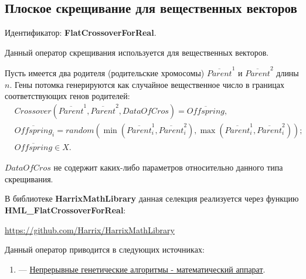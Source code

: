 \subsection{Плоское скрещивание для вещественных векторов}\label{SetOfOperatorsAlgorithms:FlatCrossoverForReal}

Идентификатор: \textbf{FlatCrossoverForReal}.

Данный оператор скрещивания используется для вещественных векторов.

Пусть имеется два родителя (родительские хромосомы) $ \overline{Parent}^1 $ и $ \overline{Parent}^2$ длины $n$. Гены потомка генерируются как случайное вещественное число в границах соответствующих генов родителей:
\begin{align}
\label{SetOfOperatorsAlgorithms:eq:FlatCrossoverForReal}
&Crossover \left( \overline{Parent}^1, \overline{Parent}^2, DataOfCros\right)= \overline{Offspring}, \\
& \overline{Offspring}_i=random\left(\min\left(\overline{Parent}^1_i, \overline{Parent}^2_i \right),\max\left(\overline{Parent}^1_i, \overline{Parent}^2_i \right)  \right);\nonumber\\
&\overline{Offspring}\in X.\nonumber
\end{align}

$ DataOfCros $ не содержит каких-либо параметров относительно данного типа скрещивания.

В библиотеке \textbf{HarrixMathLibrary} данная селекция реализуется через функцию \textbf{HML\_FlatCrossoverForReal}:

\href{https://github.com/Harrix/HarrixMathLibrary}{https://github.com/Harrix/HarrixMathLibrary}

Данный оператор приводится в следующих источниках:

\begin{enumerate}
\item \cite{web:basegroup.ru:real_coded_ga} ---  \href{http://www.basegroup.ru/library/optimization/real_coded_ga/}{Непрерывные генетические алгоритмы - математический аппарат}.
\end{enumerate}